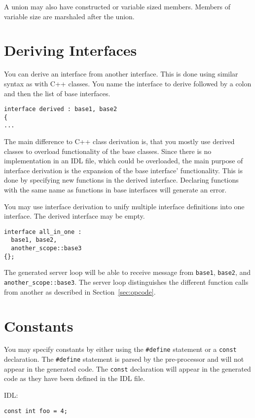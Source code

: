 A union may also have constructed or variable sized members. Members of
variable size are marshaled after the union.

\section{Deriving Interfaces}
You can derive an interface from another interface. This is done
using similar syntax as with C++ classes. You name the interface to derive
followed by a colon and then the list of base interfaces.
\begin{verbatim}
interface derived : base1, base2
{
...
\end{verbatim}

The main difference to C++ class derivation is, that you mostly use derived
classes to overload functionality of the base classes. Since there is no
implementation in an IDL file, which could be overloaded, the main purpose of
interface derivation is the expansion of the base interface' functionality.
This is done by specifying new functions in the derived interface.  Declaring
functions with the same name as functions in base interfaces will generate an
error.

You may use interface derivation to unify multiple interface definitions
into one interface. The derived interface may be empty.
\begin{verbatim}
interface all_in_one :
  base1, base2,
  another_scope::base3
{};
\end{verbatim}

The generated server loop will be able to receive message from \verb|base1|,
\verb|base2|, and \verb|another_scope::base3|. The server loop distinguishes
the different function calls from another as described in
Section~\ref{sec:opcode}.

\section{Constants}

You may specify constants by either using the \verb|#define| statement or a
{\tt const} declaration. The \verb|#define| statement is parsed by the
pre-processor and will not appear in the generated code. The {\tt const}
declaration will appear in the generated code as they have been defined in the
IDL file.

IDL:
\begin{verbatim}
const int foo = 4;
\end{verbatim}

